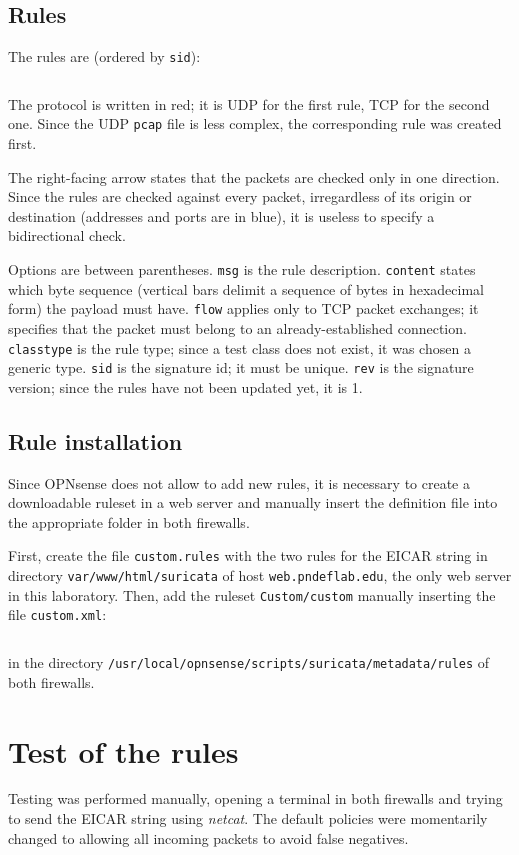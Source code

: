 \documentclass{homework}
\newcommand{\opn}{OPNsense\xspace}
\begin{document}
    \subsection{Rules}
    The rules are (ordered by \texttt{sid}):
    \inputminted[breaklines]{suricata.py:SuriLexer -x}{../pnd-lab7-es1/web/var/www/html/suricata/custom.rules}
    
    The protocol is written in red; it is UDP for the first rule, TCP for the second one.
    Since the UDP \texttt{pcap} file is less complex, the corresponding rule was created first.
    
    The right-facing arrow states that the packets are checked only in one direction.
    Since the rules are checked against every packet, irregardless of its origin or destination (addresses and ports are in blue), it is useless to specify a bidirectional check.
    
    Options are between parentheses.
    \texttt{msg} is the rule description.
    \texttt{content} states which byte sequence (vertical bars delimit a sequence of bytes in hexadecimal form) the payload must have.
    \texttt{flow} applies only to TCP packet exchanges; it specifies that the packet must belong to an already-established connection.
    \texttt{classtype} is the rule type; since a test class does not exist, it was chosen a generic type.
    \texttt{sid} is the signature id; it must be unique.
    \texttt{rev} is the signature version; since the rules have not been updated yet, it is 1.
    
    \subsection{Rule installation}
    Since \opn does not allow to add new rules, it is necessary to create a downloadable ruleset in a web server and manually insert the definition file into the appropriate folder in both firewalls.
    
    First, create the file \texttt{custom.rules} with the two rules for the EICAR string in directory \texttt{var/www/html/suricata} of host \texttt{web.pndeflab.edu}, the only web server in this laboratory.
    Then, add the ruleset \texttt{Custom/custom} manually inserting the file \texttt{custom.xml}:
    \inputminted{xml}{files/custom.xml}
    \noindent in the directory \texttt{/usr/local/opnsense/scripts/suricata/metadata/rules} of both firewalls.
    
    
    \section{Test of the rules}
    Testing was performed manually, opening a terminal in both firewalls and trying to send the EICAR string using \textit{netcat}.
    The default policies were momentarily changed to allowing all incoming packets to avoid false negatives.
    
\end{document}
